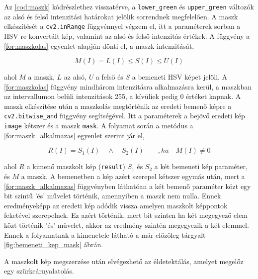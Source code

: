 \par Az \ref{cod:maszk} kódrészlethez visszatérve, a \lstinline{lower_green} és \lstinline{upper_green} változók az alsó és felső intenzitási határokat jelölik sorrendnek megfelelően. A maszk elkészítését a \lstinline{cv2.inRange} függvénnyel \cite{opencv_docs} végzem el, itt a paraméterek sorban a HSV re konvertált kép, valamint az alsó és felső intenzitás értékek.
\newline A függvény a \ref{for:maszkolas} egyenlet alapján dönti el, a maszk intenzitását,

\begin{equation}
    M(I) = L(I) \le S(I) \le U(I)
    \label{for:maszkolas}
\end{equation}

\par ahol $M$ a maszk, $L$ az alsó, $U$ a felső és $S$ a bemeneti HSV képet jelöli. A \ref{for:maszkolas} függvény mindhárom intenzitásra alkalmazásra kerül, a maszkban az intervallumon belüli intenzitások 255, a kívüliek pedig 0 értéket kapnak. A maszk elkészítése után a maszkolás megtörténik az eredeti bemenő képre a \lstinline{cv2.bitwise_and} függvény \cite{opencv_docs} segítségével. Itt a paraméterek a bejövő eredeti kép \lstinline{image} kétszer és a maszk \lstinline{mask}.
\newline A folyamat során a metódus a \ref{for:maszk_alkalmazas} egyenlet szerint jár el,

\begin{equation}
    R(I) = S_1(I)\quad \land\quad S_2(I)\qquad ,ha\quad M(I) \ne 0
    \label{for:maszk_alkalmazas}
\end{equation}

\par ahol $R$ a kimenő maszkolt kép (\lstinline{result}) $S_1$ és $S_2$ a két bemeneti kép paraméter, és $M$ a maszk. A bemenetben a kép azért szerepel kétszer egymás után, mert a \ref{for:maszk_alkalmazas} függvényben láthatóan a két bemenő paraméter közt egy bit szintű 'és' művelet történik, amennyiben a maszk nem nulla. Ennek eredményeképp az eredeti kép adódik vissza amelyen maszkolt képpontok feketével szerepelnek. Ez azért történik, mert bit szinten ha két megegyező elem közt történik 'és' művelet, akkor az eredmény szintén megegyezik a két elemmel. Ennek a folyamatnak a kimenetele látható a már előzőleg tárgyalt \ref{fig:bemeneti_kep_mask} ábrán.
\par A maszkolt kép megszerzése után elvégezhető az éldetektálás, amelyet megelőz egy szürkeárnyalatolás.

